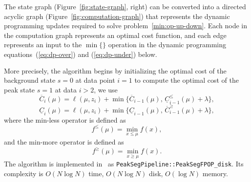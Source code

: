 \documentclass[article]{jss}
\newcommand{\R}{\proglang{R}}
\begin{document}
The state graph (Figure~\ref{fig:state-graph}, right) can be converted
into a directed acyclic graph (Figure~\ref{fig:computation-graph})
that represents the dynamic programming updates required to solve
problem~\ref{min:op-up-down}. Each node in the computation graph
represents an optimal cost function, and each edge represents an input
to the $\min\{\}$ operation in the dynamic programming
equations~(\ref{eq:dp-over}) and (\ref{eq:dp-under}) below.

More precisely, the algorithm begins by initializing the optimal cost of the background state $s=0$ at data point $i=1$ to compute the optimal cost of
the peak state $s=1$ at data $i>2$, we use
\begin{equation}
  \label{eq:dp-over}
  \overline C_{i}(\mu) = \ell(\mu, z_i) + \min\{
  \overline C_{i-1}(\mu),\, 
  \underline C_{i-1}^\leq(\mu)+\lambda
\},
\end{equation}
\begin{equation}
  \label{eq:dp-under}
    \underline C_{i}(\mu) = \ell(\mu, z_i) + \min\{
  \underline C_{i-1}(\mu),\, 
  \overline C_{i-1}^\geq(\mu)+\lambda
\},
\end{equation}
where the min-less operator is defined as 
\begin{equation}
  \label{eq:min-less}
  f^\leq(\mu) = \min_{x\leq\mu} f(x),
\end{equation}
and the min-more operator is defined as
\begin{equation}
  \label{eq:min-more}
  f^\geq(\mu) = \min_{x\geq\mu} f(x).
\end{equation}
The algorithm is implemented in \R\ as
\verb|PeakSegPipeline::PeakSegFPOP_disk|. Its complexity is
$O(N\log N)$ time, $O(N\log N)$ disk, $O(\log N)$ memory.
\end{document}

